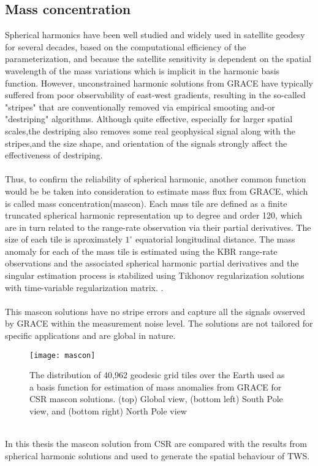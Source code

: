 \subsection{Mass concentration}
Spherical harmonics have been well studied and widely used in satellite geodesy for several decades, based on the computational efficiency of the parameterization, and because the satellite sensitivity is dependent on the spatial wavelength of the mass variations which is implicit in the harmonic basis function. However, unconstrained harmonic solutions from GRACE have typically suffered from poor observability of east-west gradients, resulting in the so-called "stripes" that are conventionally removed via empirical smooting and-or "destriping" algorithms. Although quite effective, especially for larger spatial scales,the destriping also removes some real geophysical signal along with the stripes,and the size shape, and orientation of the signals strongly affect the effectiveness of destriping.\cite{watkins2015improved} \\\\
Thus, to confirm the reliability of spherical harmonic, another common function would be be taken into consideration to estimate mass flux from GRACE, which is called mass concentration(mascon). Each mass tile are defined as a finite truncated spherical harmonic representation up to degree and order 120, which are in turn related to the range-rate observation via their partial derivatives. The size of each tile is aproximately $1^{\circ}$ equatorial longitudinal distance. The mass anomaly for each of the mass tile is estimated using the KBR range-rate observations and the associated spherical harmonic partial derivatives and the singular estimation process is stabilized using Tikhonov regularization solutions with time-variable regularization matrix. \cite{save2016high}. \\\\
This mascon solutions have no stripe errors and capture all the signals ovserved by GRACE within the measurement noise level. The solutions are not tailored for specific applications and are global in nature.\cite{save2016high} 
\begin{figure}[htbp]
	\centering
	\texttt{[image: mascon]} %
	\caption{The distribution of 40,962 geodesic grid tiles over the Earth used as a basis function for estimation of mass
		anomalies from GRACE for CSR mascon solutions. (top) Global view, (bottom left) South Pole view, and (bottom right) North Pole view \cite{save2016high}} 
	\label{fig:mascon}
\end{figure}\\
In this thesis the mascon solution from CSR are compared with the results from spherical harmonic solutions and used to generate the spatial behaviour of TWS.
\newpage
